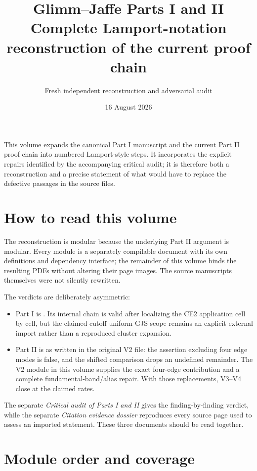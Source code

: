 \documentclass[11pt,a4paper]{article}
\title{Glimm--Jaffe Parts I and II\\[4pt]
\large Complete Lamport-notation reconstruction of the current proof chain}
\author{Fresh independent reconstruction and adversarial audit}
\date{16 August 2026}
\begin{document}
\maketitle

\begin{resultbox}
This volume expands the canonical Part I manuscript and the current Part II proof
chain into numbered Lamport-style steps.  It incorporates the explicit repairs
identified by the accompanying critical audit; it is therefore both a reconstruction
and a precise statement of what would have to replace the defective passages in the
source files.
\end{resultbox}

\section*{How to read this volume}

The reconstruction is modular because the underlying Part II argument is modular.
Every module is a separately compilable document with its own definitions and
dependency interface; the remainder of this volume binds the resulting PDFs without
altering their page images.  The source manuscripts themselves were not silently
rewritten.

The verdicts are deliberately asymmetric:

\begin{itemize}
\item Part I is \Conditional.  Its internal chain is valid after localizing the CE2
application cell by cell, but the claimed cutoff-uniform GJS scope remains an explicit
external import rather than a reproduced cluster expansion.
\item Part II is \Fail{} as written in the original V2 file: the assertion excluding
four edge modes is false, and the shifted comparison drops an undefined remainder.
The V2 module in this volume supplies the exact four-edge contribution and a complete
fundamental-band/alias repair.  With those replacements, V3--V4 close at the claimed
rates.
\end{itemize}

The separate \emph{Critical audit of Parts I and II} gives the finding-by-finding
verdict, while the separate \emph{Citation evidence dossier} reproduces every
source page used to assess an imported statement.  These three documents should be
read together.

\section*{Module order and coverage}
\end{document}
